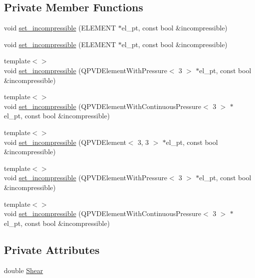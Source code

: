 \subsection*{Private Member Functions}
\begin{DoxyCompactItemize}
\item 
void \hyperlink{classSimpleShearProblem_a3e5d5f57fc041531ee683f50395536f0}{set\+\_\+incompressible} (E\+L\+E\+M\+E\+NT $\ast$el\+\_\+pt, const bool \&incompressible)
\item 
void \hyperlink{classSimpleShearProblem_a3e5d5f57fc041531ee683f50395536f0}{set\+\_\+incompressible} (E\+L\+E\+M\+E\+NT $\ast$el\+\_\+pt, const bool \&incompressible)
\item 
{\footnotesize template$<$$>$ }\\void \hyperlink{classSimpleShearProblem_a064e94ff77e20bc81cd4ddbec58f26aa}{set\+\_\+incompressible} (Q\+P\+V\+D\+Element\+With\+Pressure$<$ 3 $>$ $\ast$el\+\_\+pt, const bool \&incompressible)
\item 
{\footnotesize template$<$$>$ }\\void \hyperlink{classSimpleShearProblem_a4f91c840813899e3977937e01e3bbb1e}{set\+\_\+incompressible} (Q\+P\+V\+D\+Element\+With\+Continuous\+Pressure$<$ 3 $>$ $\ast$el\+\_\+pt, const bool \&incompressible)
\item 
{\footnotesize template$<$$>$ }\\void \hyperlink{classSimpleShearProblem_af8ac5eb5a799de066ec2128905cd4ef6}{set\+\_\+incompressible} (Q\+P\+V\+D\+Element$<$ 3, 3 $>$ $\ast$el\+\_\+pt, const bool \&incompressible)
\item 
{\footnotesize template$<$$>$ }\\void \hyperlink{classSimpleShearProblem_a064e94ff77e20bc81cd4ddbec58f26aa}{set\+\_\+incompressible} (Q\+P\+V\+D\+Element\+With\+Pressure$<$ 3 $>$ $\ast$el\+\_\+pt, const bool \&incompressible)
\item 
{\footnotesize template$<$$>$ }\\void \hyperlink{classSimpleShearProblem_a4f91c840813899e3977937e01e3bbb1e}{set\+\_\+incompressible} (Q\+P\+V\+D\+Element\+With\+Continuous\+Pressure$<$ 3 $>$ $\ast$el\+\_\+pt, const bool \&incompressible)
\end{DoxyCompactItemize}
\subsection*{Private Attributes}
\begin{DoxyCompactItemize}
\item 
double \hyperlink{classSimpleShearProblem_a3844145c334e84c6ed94d803aeb1a337}{Shear}
\end{DoxyCompactItemize}


